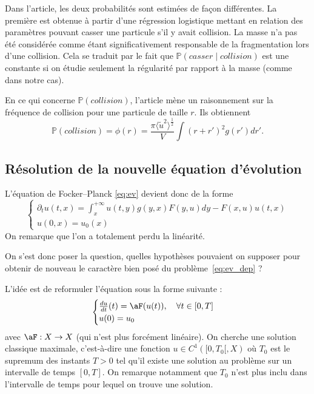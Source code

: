 Dans l'article, les deux probabilités sont estimées de façon différentes. La première est obtenue à partir d'une régression logistique mettant en relation des paramètres pouvant casser une particule s'il y avait collision.
La masse n'a pas été considérée comme étant significativement responsable de la fragmentation lors d'une collision. Cela se traduit par le fait que $\mathbb{P}(casser \mid collision)$ est une \og constante \fg{} si on étudie seulement la régularité par rapport à la masse (comme dans notre cas).

En ce qui concerne $\mathbb{P}(collision)$, l'article mène un raisonnement sur la fréquence de collision pour une particule de taille $r$. Ils obtiennent
\[
	\mathbb{P}(collision) = \phi(r) = \frac{\pi\langle \tilde{u}^2\rangle^{\frac{1}{2}}}{V} \int (r + r')^2 g(r') dr'.
\]

\subsection{Résolution de la nouvelle équation d'évolution}

\begin{important}
	L'équation de Focker--Planck \ref{eq:ev} devient donc de la forme
	\begin{equation}
		\begin{cases}
			\partial_t u(t,x) = \int_x^{+\infty} u(t,y) g(y,x) F(y,u) dy - F(x,u) u(t,x) \\
			u(0,x) = u_0(x)
		\end{cases}
		\label{eq:ev_dep}
	\end{equation}
	On remarque que l'on a totalement perdu la linéarité.
\end{important}

On s'est donc poser la question, quelles hypothèses pouvaient on supposer pour obtenir de nouveau le caractère bien posé du problème~\ref{eq:ev_dep} ?

\begin{important}
	L'idée est de reformuler l'équation sous la forme suivante :
	\begin{equation}
		\begin{cases}
			\frac{du}{dt}(t) = \aF(u(t)), \quad \forall t \in [0,T] \\
			u(0) = u_0
		\end{cases}
		\label{eq:ev_nonop}
	\end{equation}
	avec $\aF : X \to X$ (qui n'est plus forcément linéaire). On cherche une solution classique maximale, c'est-à-dire une fonction $u \in C^1([0,T_0[, X)$ où $T_0$ est le supremum des instants $T > 0$ tel qu'il existe une solution au problème sur un intervalle de temps $[0,T]$. On remarque notamment que $T_0$ n'est plus inclu dans l'intervalle de temps pour lequel on trouve une solution.
\end{important}

